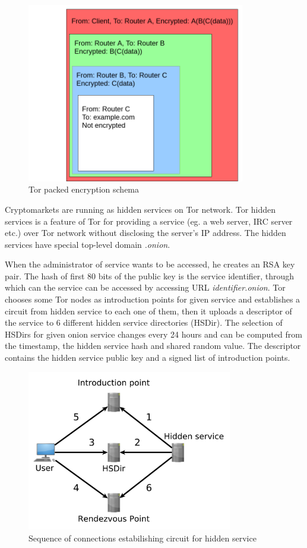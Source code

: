 \documentclass[
  digital, %
  table,   %
  lof,     %
  lot,     %
  oneside
]{fithesis3}
\begin{document}
\begin{figure}[!htb]
    \centering
    \includegraphics[width=0.85\textwidth]{tor-packet}
    \caption{Tor packed encryption schema}
    \label{tor-packet}
\end{figure}
 
Cryptomarkets are running as hidden services on Tor network.
Tor hidden services is a feature of Tor for providing a service (eg. a web server, IRC server etc.) over Tor network
without disclosing the server's IP address. The hidden services have special top-level domain \emph{.onion}.

When the administrator of service wants to be accessed, he creates an RSA key pair.
The hash of first 80 bits of the public key is the service identifier,
through which can the service can be accessed by accessing URL \emph{identifier.onion}.
Tor chooses some Tor nodes as introduction points for given service and establishes a circuit from hidden service
to each one of them,
then it uploads a descriptor of the service to 6 different hidden service directories (HSDir).
The selection of HSDirs for given onion service
changes every 24 hours and can be computed from the timestamp, the hidden service hash and shared random value.
The descriptor contains the hidden service public key and a signed list of introduction points.

\begin{figure}[!htb]
    \centering
    \includegraphics[width=0.8\textwidth]{onion.pdf}
    \caption{Sequence of connections estabilishing circuit for hidden service}
    \label{onionservice}
\end{figure}
\end{document}
